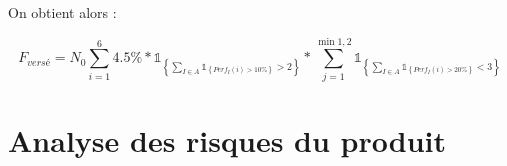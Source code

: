 \documentclass[french,12pt,a4paper]{article}
\begin{document}
  On obtient alors :
  
  $$ F_{versé} = N_{0} \sum_{i=1}^{6}4.5\%*\mathds{1}_{\left\lbrace \sum_{I \in A} \mathds{1}_{\left\lbrace Perf_{I}(i)>10\% \right\rbrace}>2 \right\rbrace} * \sum_{j=1}^{\min{1,2}} \mathds{1}_{\left\lbrace \sum_{I \in A} \mathds{1}_{\left\lbrace Perf_{I}(i)>20\% \right\rbrace}<3 \right\rbrace} $$
  
\section{Analyse des risques du produit}
\end{document}
